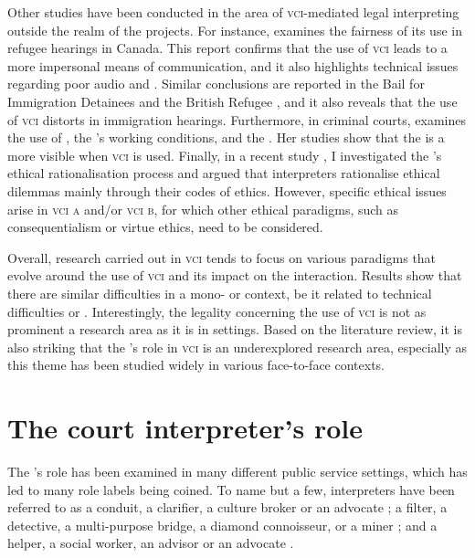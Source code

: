 \documentclass[output=paper]{langsci/langscibook}
\begin{document}
Other studies have been conducted in the area of \textsc{vci}-mediated legal interpreting outside the realm of the  projects. For instance, \citet{Ellis2004} examines the fairness of its use in refugee hearings in Canada. This report confirms that the use of \textsc{vci} leads to a more impersonal means of communication, and it also highlights technical issues regarding poor audio and . Similar conclusions are reported in the Bail for Immigration Detainees and the British Refugee , and it also reveals that the use of \textsc{vci}  distorts  in immigration hearings. Furthermore, in  criminal courts, \citet{Fowler2012} examines the use of , the ’s working conditions, and the . Her studies show that the  is a more visible  when \textsc{vci}  is used. Finally, in a recent study \citet{Devaux2017a}, I investigated the ’s ethical rationalisation process and argued that interpreters rationalise ethical dilemmas mainly through their codes of ethics. However, specific ethical issues arise in \textsc{vci a} and/or \textsc{vci b}, for which other ethical paradigms, such as consequentialism or virtue ethics, need to be considered. 

Overall, research carried out in \textsc{vci} tends to focus on various paradigms that evolve around the use of \textsc{vci}  and its impact on the interaction. Results show that there are similar difficulties in a mono- or  context, be it related to technical difficulties or . Interestingly, the legality concerning the use of \textsc{vci} is not as prominent a research area as it is in  settings. Based on the literature review, it is also striking that the ’s role in \textsc{vci} is an underexplored research area, especially as this theme has been studied widely in various face-to-face contexts. 

\section{The court interpreter’s role}
\label{sec:devaux:3}
The ’s role has been examined in many different public service settings, which has led to many role labels being coined. To name but a few, interpreters have been referred to as a conduit, a clarifier, a culture broker or an advocate \citep{Niska2002}; a filter, a detective, a multi-purpose bridge, a diamond connoisseur, or a miner \citep{Angelelli2004}; and a helper, a social worker, an advisor or an advocate \citep{Grbic2011}.
\end{document}
